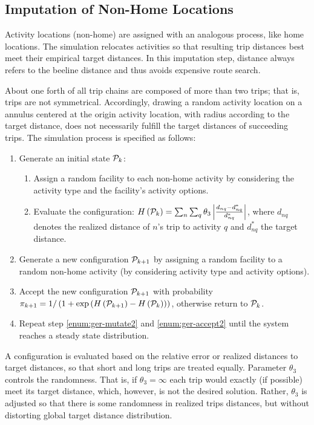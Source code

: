 \subsection{Imputation of Non-Home Locations}
\label{ch:germany:imputation2}
Activity locations (non-home) are assigned with an analogous process, like home locations. The simulation relocates activities so that resulting trip distances best meet their empirical target distances. In this imputation step, distance always refers to the beeline distance and thus avoids expensive route search. 

About one forth of all trip chains are composed of more than two trips; that is, trips are not symmetrical. Accordingly, drawing a random activity location on a annulus centered at the origin activity location, with radius according to the target distance, does not necessarily fulfill the target distances of succeeding trips. The simulation process is specified as follows:

\begin{enumerate}
\item Generate an initial state ${\cal P}_k$:
\begin{enumerate}
\item Assign a random facility to each non-home activity by considering the activity type and the facility's activity options.
\item Evaluate the configuration: $H\left( {\cal P}_k \right)=\sum_n \sum_q \theta_3 \left| \frac{d_{nq} - d_{nq}^*}{d_{nq}^*}\right|$, where $d_{nq}$ denotes the realized distance of $n$'s trip to activity $q$ and $d_{nq}^*$ the target distance.
\end{enumerate}
\item \label{enum:ger-mutate2} Generate a new configuration ${\cal P}_{k+1}$ by assigning a random facility to a random non-home activity (by considering activity type and activity options).
\item \label{enum:ger-accept2} Accept the new configuration ${\cal P}_{k+1}$ with probability $\pi_{k+1} = 1 / \left( 1 + \exp \left(  H\left( {\cal P}_{k+1} \right) - H \left( {\cal P}_{k} \right) \right)\right)$, otherwise return to ${\cal P}_{k}$.

\item Repeat step \ref{enum:ger-mutate2} and \ref{enum:ger-accept2} until the system reaches a steady state distribution.
\end{enumerate}

A configuration is evaluated based on the relative error or realized distances to target distances, so that short and long trips are treated equally. Parameter $\theta_3$ controls the randomness. That is, if $\theta_3 = \infty$ each trip would exactly (if possible) meet its target distance, which, however, is not the desired solution. Rather, $\theta_3$ is adjusted so that there is some randomness in realized trips distances, but without distorting global target distance distribution.

